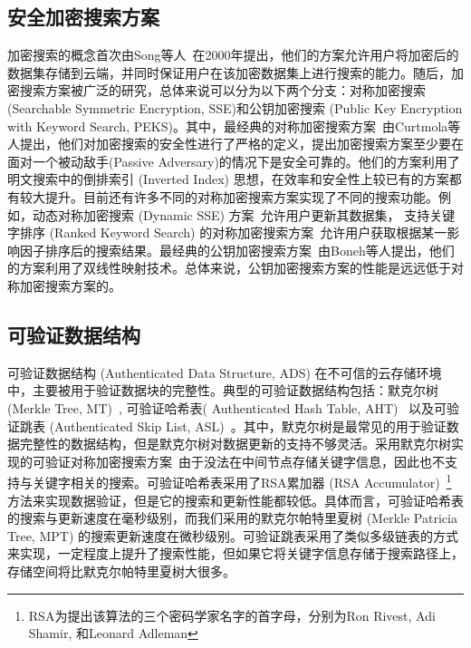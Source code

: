 \subsection{安全加密搜索方案}
加密搜索的概念首次由Song等人~\cite{song2000practical}在2000年提出，他们的方案允许用户将加密后的数据集存储到云端，并同时保证用户在该加密数据集上进行搜索的能力。随后，加密搜索方案被广泛的研究，总体来说可以分为以下两个分支：对称加密搜索 (Searchable Symmetric Encryption, SSE)和公钥加密搜索 (Public Key Encryption with Keyword Search, PEKS)。其中，最经典的对称加密搜索方案~\cite{curtmola2011searchable}由Curtmola等人提出，他们对加密搜索的安全性进行了严格的定义，提出加密搜索方案至少要在面对一个被动敌手(Passive Adversary)的情况下是安全可靠的。他们的方案利用了明文搜索中的倒排索引 (Inverted Index) 思想，在效率和安全性上较已有的方案都有较大提升。目前还有许多不同的对称加密搜索方案实现了不同的搜索功能。例如，动态对称加密搜索 (Dynamic SSE) 方案~\cite{kamara2012dynamic,cash2014dynamic,stefanov2014practical}允许用户更新其数据集， 支持关键字排序 (Ranked Keyword Search) 的对称加密搜索方案~\cite{wang2010secure}允许用户获取根据某一影响因子排序后的搜索结果。最经典的公钥加密搜索方案~\cite{boneh2004public}由Boneh等人提出，他们的方案利用了双线性映射技术。总体来说，公钥加密搜索方案的性能是远远低于对称加密搜索方案的。


\subsection{可验证数据结构}
可验证数据结构 (Authenticated Data Structure, ADS) 在不可信的云存储环境中，主要被用于验证数据块的完整性。典型的可验证数据结构包括：默克尔树 (Merkle Tree, MT)~\cite{merkle1987digital}, 可验证哈希表( Authenticated Hash Table, AHT)~\cite{papamanthou2008authenticated} 以及可验证跳表 (Authenticated Skip List, ASL)~\cite{pugh1990skip,goodrich2001implementation}。其中，默克尔树是最常见的用于验证数据完整性的数据结构，但是默克尔树对数据更新的支持不够灵活。采用默克尔树实现的可验证对称加密搜索方案~\cite{kamara2011cs2}由于没法在中间节点存储关键字信息，因此也不支持与关键字相关的搜索。可验证哈希表采用了RSA累加器 (RSA Accumulator)~\footnote{RSA为提出该算法的三个密码学家名字的首字母，分别为Ron Rivest, Adi Shamir, 和Leonard Adleman}  方法来实现数据验证，但是它的搜索和更新性能都较低。具体而言，可验证哈希表的搜索与更新速度在毫秒级别，而我们采用的默克尔帕特里夏树 (Merkle Patricia Tree, MPT) 的搜索更新速度在微秒级别。可验证跳表采用了类似多级链表的方式来实现，一定程度上提升了搜索性能，但如果它将关键字信息存储于搜索路径上，存储空间将比默克尔帕特里夏树大很多。


